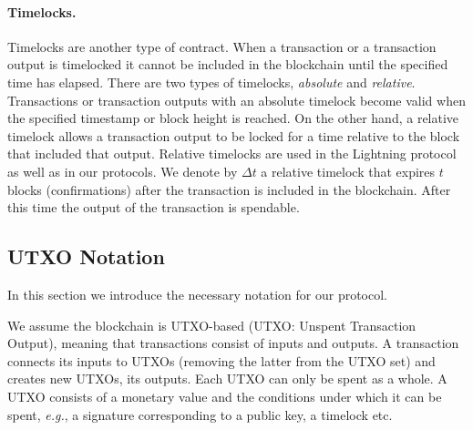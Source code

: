\documentclass[runningheads]{llncs}
\newcommand{\authnote}[3]{{ \footnotesize \bf{#1[#2: #3]~}}} %
\newcommand{\edit}[1]{\authnote{\color{blue}}{edit}{#1}}
\newcommand{\eg}{{\em e.g.}}
\newcommand{\sys}{\textsc{Cerberus}\xspace}
\begin{document}
\paragraph{Timelocks.} Timelocks are another type of contract. When a transaction or a transaction output is timelocked it cannot be included in the blockchain until the specified time has elapsed. There are two types of timelocks, \textit{absolute} and \textit{relative}. Transactions or transaction outputs with an absolute timelock become valid when the specified timestamp or block height is reached. On the other hand, a relative timelock allows a transaction output to be locked for a time relative to the block that included that output. 
Relative timelocks are used in the Lightning  protocol as well as in our protocols.
We denote by $\Delta t$ a relative timelock that expires $t$ blocks (confirmations) after the transaction is included in the blockchain. After this time the output of the transaction is spendable.



\subsection{UTXO Notation}
In this section we introduce the necessary notation for our protocol.

We assume the blockchain is UTXO-based (UTXO: Unspent Transaction Output), meaning that transactions consist of inputs and outputs. 
A transaction  connects its inputs to UTXOs (removing the latter from the UTXO set) and creates new UTXOs, its outputs. 
Each UTXO can only be spent as a whole. A UTXO consists of a monetary value and the conditions under which it can be spent, \eg, a signature corresponding to a public key, a timelock etc. 
\end{document}
